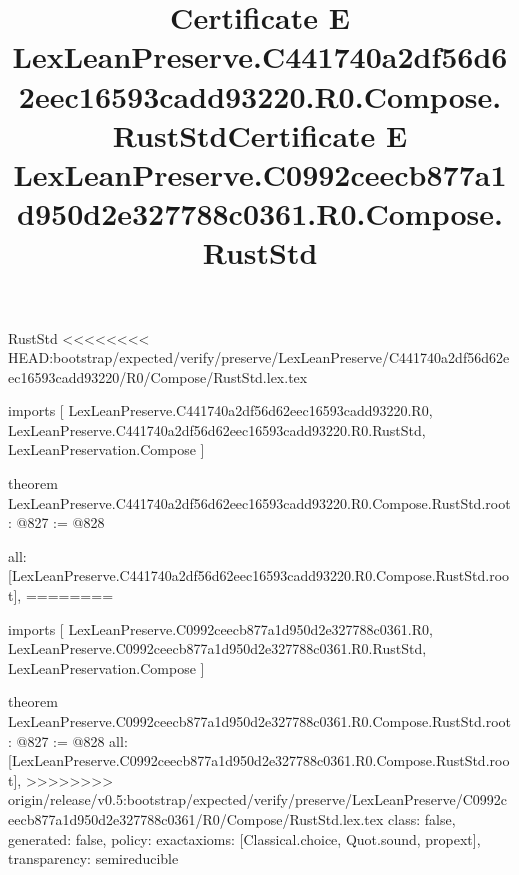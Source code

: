 \begin{lexlean}{RustStd}
<<<<<<<< HEAD:bootstrap/expected/verify/preserve/LexLeanPreserve/C441740a2df56d62eec16593cadd93220/R0/Compose/RustStd.lex.tex
\title{Certificate E LexLeanPreserve.C441740a2df56d62eec16593cadd93220.R0.Compose.RustStd}
\begin{coremodule}
imports [
  LexLeanPreserve.C441740a2df56d62eec16593cadd93220.R0,
  LexLeanPreserve.C441740a2df56d62eec16593cadd93220.R0.RustStd,
  LexLeanPreservation.Compose
]

theorem LexLeanPreserve.C441740a2df56d62eec16593cadd93220.R0.Compose.RustStd.root : @827 := @828 {
  all: [LexLeanPreserve.C441740a2df56d62eec16593cadd93220.R0.Compose.RustStd.root],
========
\title{Certificate E LexLeanPreserve.C0992ceecb877a1d950d2e327788c0361.R0.Compose.RustStd}
\begin{coremodule}
imports [
  LexLeanPreserve.C0992ceecb877a1d950d2e327788c0361.R0,
  LexLeanPreserve.C0992ceecb877a1d950d2e327788c0361.R0.RustStd,
  LexLeanPreservation.Compose
]

theorem LexLeanPreserve.C0992ceecb877a1d950d2e327788c0361.R0.Compose.RustStd.root : @827 := @828 {
  all: [LexLeanPreserve.C0992ceecb877a1d950d2e327788c0361.R0.Compose.RustStd.root],
>>>>>>>> origin/release/v0.5:bootstrap/expected/verify/preserve/LexLeanPreserve/C0992ceecb877a1d950d2e327788c0361/R0/Compose/RustStd.lex.tex
  class: false,
  generated: false,
  policy: exact{axioms: [Classical.choice, Quot.sound, propext]},
  transparency: semireducible
}


\end{coremodule}}
\end{coremodule}
\end{lexlean}
